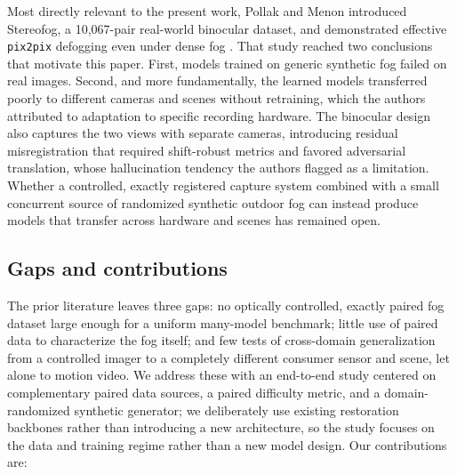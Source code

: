 \documentclass{optica-article}
\begin{document}
Most directly relevant to the present work, Pollak and Menon
introduced Stereofog, a 10{,}067-pair real-world binocular dataset,
and demonstrated effective \texttt{pix2pix} defogging even under
dense fog \cite{pollak2024stereofog}. That study reached two
conclusions that motivate this paper. First, models trained on
generic synthetic fog failed on real images. Second, and more
fundamentally, the learned models transferred poorly to different
cameras and scenes without retraining, which the authors attributed
to adaptation to specific recording hardware. The binocular design
also captures the two views with separate cameras, introducing
residual misregistration that required shift-robust metrics and
favored adversarial translation, whose hallucination tendency the
authors flagged as a limitation. Whether a controlled, exactly
registered capture system combined with a small concurrent source
of randomized synthetic outdoor fog can instead produce models that
transfer across hardware and scenes has remained open.
 
\subsection{Gaps and contributions}
\label{sec:contributions}

The prior literature leaves three gaps: no optically controlled,
exactly paired fog dataset large enough for a uniform many-model
benchmark; little use of paired data to characterize the fog
itself; and few tests of cross-domain generalization from a
controlled imager to a completely different consumer sensor and
scene, let alone to motion video. We address these with an
end-to-end study centered on complementary paired data sources, a
paired difficulty metric, and a domain-randomized synthetic
generator; we deliberately use existing
restoration backbones rather than introducing a new architecture,
so the study focuses on the data and training regime rather than a
new model design. Our
contributions are:
\end{document}
